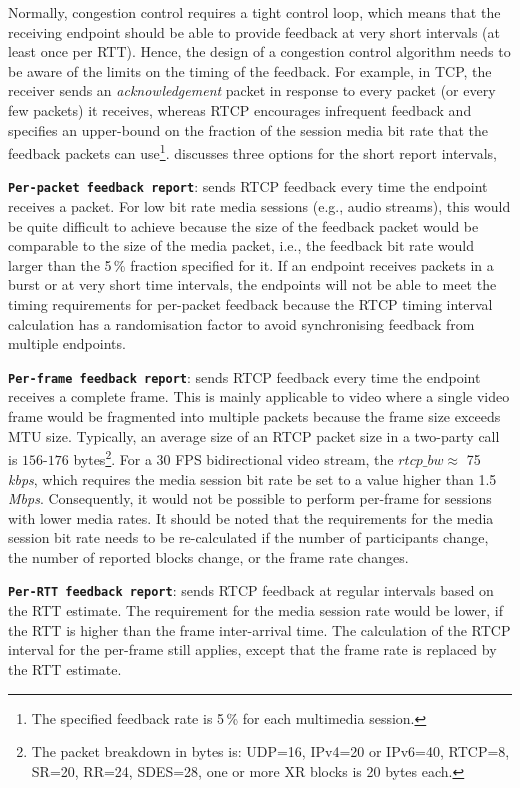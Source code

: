 Normally, congestion control requires a tight control loop, which means that
the receiving endpoint should be able to provide feedback at very short
intervals (at least once per RTT). Hence, the design of a congestion control
algorithm needs to be aware of the limits on the timing of the feedback. For
example, in TCP, the receiver sends an \emph{acknowledgement} packet in
response to every packet (or every few packets) it receives, whereas RTCP
encourages infrequent feedback and specifies an upper-bound on the fraction of
the session media bit rate that the feedback packets can use\footnote{The
specified feedback rate is 5\,\% for each multimedia session.}.
\cite{draft.rmcat.feedback} discusses three options for the short report
intervals,

\textbf{\texttt{Per-packet feedback report}}: sends RTCP feedback every time
the endpoint receives a packet. For low bit rate media sessions (e.g., audio
streams), this would be quite difficult to achieve because the size of the
feedback packet would be comparable to the size of the media packet, i.e., the
feedback bit rate would larger than the 5\,\% fraction specified for it. If an
endpoint receives packets in a burst or at very short time intervals, the
endpoints will not be able to meet the timing requirements for per-packet
feedback because the RTCP timing interval calculation has a randomisation
factor to avoid synchronising feedback from multiple endpoints.

\textbf{\texttt{Per-frame feedback report}}: sends RTCP feedback every time
the endpoint receives a complete frame. This is mainly applicable to video
where a single video frame would be fragmented into multiple packets because
the frame size exceeds MTU size. Typically, an average size of an RTCP packet
size in a two-party call is $156$-$176$ bytes\footnote{The packet breakdown in
bytes is: UDP=16, IPv4=20 or IPv6=40, RTCP=8, SR=20, RR=24, SDES=28, one or
more XR blocks is 20 bytes each.}. For a 30 FPS bidirectional video stream, the
$rtcp\_bw \approx$ 75\,\emph{kbps}, which requires the media session bit rate
be set to a value higher than 1.5\,\emph{Mbps}. Consequently, it would not be
possible to perform per-frame for sessions with lower media rates. It should
be noted that the requirements for the media session bit rate needs to be
re-calculated if the number of participants change, the number of reported
blocks change, or the frame rate changes.

\textbf{\texttt{Per-RTT feedback report}}: sends RTCP feedback at regular
intervals based on the RTT estimate. The requirement for the media session
rate would be lower, if the RTT is higher than the frame inter-arrival time.
The calculation of the RTCP interval for the per-frame still applies, except
that the frame rate is replaced by the RTT estimate.

